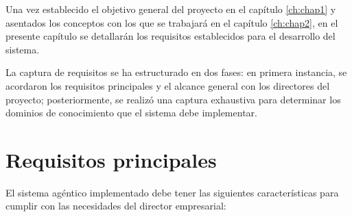 Una vez establecido el objetivo general del proyecto en el capítulo \ref{ch:chap1} y asentados los conceptos con los que se trabajará en el capítulo \ref{ch:chap2}, en el presente capítulo se detallarán los requisitos establecidos para el desarrollo del sistema.

La captura de requisitos se ha estructurado en dos fases: en primera instancia, se acordaron los requisitos principales y el alcance general con los directores del proyecto; posteriormente, se realizó una captura exhaustiva para determinar los dominios de conocimiento que el sistema debe implementar.

\section{Requisitos principales}

El sistema agéntico implementado debe tener las siguientes características para cumplir con las necesidades del director empresarial: 

